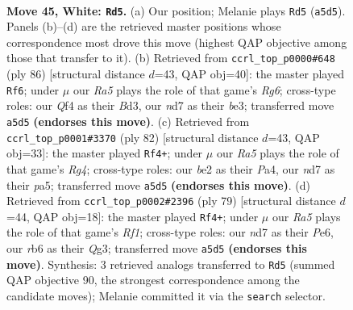 \documentclass[11pt]{article}
\begin{document}
\clearpage

\begin{figure}[p]\centering
\begin{subfigure}{0.46\textwidth}\centering
\resizebox{\linewidth}{!}{%
\newchessgame
\chessboard[
  setfen={3k4/1p1n4/1r1p4/R7/1P2PQ2/8/4b1PP/K7 w - - 2 45},
  showmover=false,
  pgfstyle=straightmove, color=movearrow, markmove={a5-d5}
]}
\caption{}
\end{subfigure}\hfill
\begin{subfigure}{0.46\textwidth}\centering
\resizebox{\linewidth}{!}{%
\newchessgame
\chessboard[
  setfen={2k5/1p6/6R1/P1r2p1p/7P/3Bb1P1/8/7K w - - 2 44},
  showmover=false,
  pgfstyle=straightmove, color=movearrow, markmove={g6-f6}
]}
\caption{}
\end{subfigure}
\\[4pt]
\begin{subfigure}{0.46\textwidth}\centering
\resizebox{\linewidth}{!}{%
\newchessgame
\chessboard[
  setfen={8/1B2nk2/4r3/p2p4/P5R1/1P2P3/5K2/8 w - - 0 42},
  showmover=false,
  pgfstyle=straightmove, color=movearrow, markmove={g4-f4}
]}
\caption{}
\end{subfigure}\hfill
\begin{subfigure}{0.46\textwidth}\centering
\resizebox{\linewidth}{!}{%
\newchessgame
\chessboard[
  setfen={k4r2/p5p1/B3p3/P7/3PK1Pp/6q1/8/R6Q b - - 2 40},
  showmover=false,
  pgfstyle=straightmove, color=movearrow, markmove={f8-f4}
]}
\caption{}
\end{subfigure}
\caption{\textbf{Move 45, White: \texttt{Rd5}.} (a) Our position; Melanie plays \texttt{Rd5} (\texttt{a5d5}). Panels (b)--(d) are the retrieved master positions whose correspondence most drove this move (highest QAP objective among those that transfer to it). (b) Retrieved from \texttt{ccrl\_top\_p0000\#648} (ply 86) [structural distance $d$=43, QAP obj=40]: the master played \texttt{Rf6}; under $\mu$ our \emph{Ra5} plays the role of that game's \emph{Rg6}; cross-type roles: our \emph{Q}f4 as their \emph{B}d3, our \emph{n}d7 as their \emph{b}e3; transferred move \texttt{a5d5} \textbf{(endorses this move)}. (c) Retrieved from \texttt{ccrl\_top\_p0001\#3370} (ply 82) [structural distance $d$=43, QAP obj=33]: the master played \texttt{Rf4+}; under $\mu$ our \emph{Ra5} plays the role of that game's \emph{Rg4}; cross-type roles: our \emph{b}e2 as their \emph{P}a4, our \emph{n}d7 as their \emph{p}a5; transferred move \texttt{a5d5} \textbf{(endorses this move)}. (d) Retrieved from \texttt{ccrl\_top\_p0002\#2396} (ply 79) [structural distance $d$=44, QAP obj=18]: the master played \texttt{Rf4+}; under $\mu$ our \emph{Ra5} plays the role of that game's \emph{Rf1}; cross-type roles: our \emph{n}d7 as their \emph{P}e6, our \emph{r}b6 as their \emph{Q}g3; transferred move \texttt{a5d5} \textbf{(endorses this move)}. Synthesis: 3 retrieved analogs transferred to \texttt{Rd5} (summed QAP objective 90, the strongest correspondence among the candidate moves); Melanie committed it via the \texttt{search} selector.}
\label{fig:thought-m88}
\end{figure}
\end{document}
